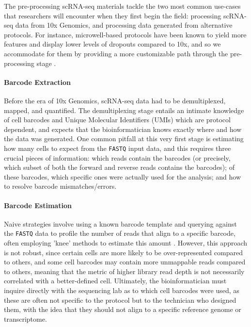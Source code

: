 \documentclass[a4paper,num-refs]{oup-contemporary}
\newcommand{\fileformat}[1]{\texttt{#1}} %
\begin{document}
The pre-processing scRNA-seq materials tackle the two most common use-cases that researchers will encounter when they first begin the field: processing scRNA-seq data from 10x Genomics, and processing data generated from alternative protocols. For instance, microwell-based protocols have been known to yield more features and display lower levels of dropouts compared to 10x, and so we accommodate for them by providing a more customizable path through the pre-processing stage \citep{wang2019direct}.

\paragraph{Barcode Extraction}
Before the era of 10x Genomics, scRNA-seq data had to be demultiplexed, mapped, and quantified. The demultiplexing stage entails an intimate knowledge of cell barcodes and Unique Molecular Identifiers (UMIs) which are protocol dependent, and expects that the bioinformatician knows exactly where and how the data was generated. One common pitfall at this very first stage is estimating how many cells to expect from the \fileformat{FASTQ} input data, and this requires three crucial pieces of information: which reads contain the barcodes (or precisely, which subset of both the forward and reverse reads contains the barcodes); of these barcodes, which specific ones were actually used for the analysis; and how to resolve barcode mismatches/errors.

\paragraph{Barcode Estimation}
Naive strategies involve using a known barcode template and querying against the \fileformat{FASTQ} data to profile the number of reads that align to a specific barcode, often employing 'knee' methods to estimate this amount \cite{smith2017umi}. However, this approach is not robust, since certain cells are more likely to be over-represented compared to others, and some cell barcodes may contain more unmappable reads compared to others, meaning that the metric of higher library read depth is not necessarily correlated with a better-defined cell.
Ultimately, the bioinformatician must inquire directly with the sequencing lab as to which cell barcodes were used, as these are often not specific to the protocol but to the technician who designed them, with the idea that they should not align to a specific reference genome or transcriptome.
\end{document}
